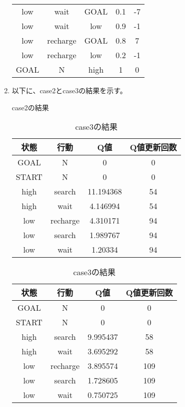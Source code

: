 \begin{enumerate}
\begin{table}
\begin{minipage}[t]{0.45\hsize}
\begin{tabular}{|c|c|c|c|c|}
            \hline
            low & wait & GOAL & 0.1 & -7 \\
            low & wait & low & 0.9 & -1 \\
            \hline
            low & recharge & GOAL & 0.8 & 7 \\
            low & recharge & low & 0.2 & -1 \\
            \hline
            GOAL & N & high & 1 & 0 \\
            \hline
          \end{tabular}
        \end{minipage}
  \end{table}
  
  \item 以下に、case2とcase3の結果を示す。
  \begin{table}
    \begin{minipage}[t]{0.45\hsize}
      \centering
      \caption{case2の結果}
      \label{table:4}
      \begin{tabular}{|c|c|c|c|}
        \hline
        状態 & 行動 & Q値 & Q値更新回数\\
        \hline
        GOAL & N & 0 & 0 \\
        START & N & 0 & 0 \\
        high & search & 11.194368 & 54 \\
        high & wait & 4.146994 & 54 \\
        low & recharge & 4.310171 & 94 \\
        low & search & 1.989767 & 94 \\
        low & wait & 1.20334 & 94 \\
        \hline
      \end{tabular}
    \end{minipage}
    \begin{minipage}[t]{0.45\hsize}
      \centering
      \caption{case3の結果}
      \label{table:5}
        \begin{tabular}{|c|c|c|c|}
          \hline
          状態 & 行動 & Q値 & Q値更新回数\\
          \hline
          GOAL & N & 0 & 0 \\
          START & N & 0 & 0 \\
          high & search & 9.995437 & 58 \\
          high & wait & 3.695292 & 58 \\
          low & recharge & 3.895574 & 109 \\
          low & search & 1.728605 & 109 \\
          low & wait & 0.750725 & 109 \\
          \hline
        \end{tabular}
      \end{minipage}
  \end{table}



\end{enumerate}



